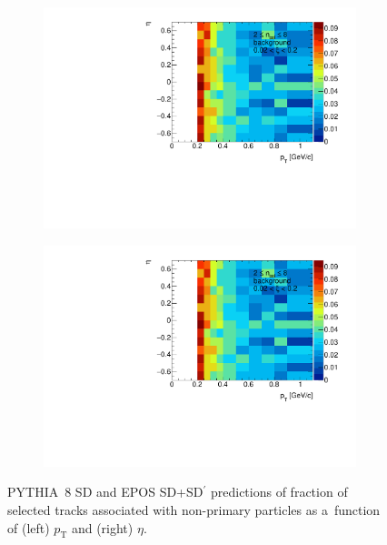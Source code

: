 \begin{figure}[h!]
	\centering
	\begin{subfigure}{.45\textwidth}
		\includegraphics[width=\linewidth, page=8]{chapters/chrgSTAR/img/chargedBkg/bkg2D.pdf}
	\end{subfigure}
	\begin{subfigure}{.45\textwidth}
		\includegraphics[width=\linewidth, page=9]{chapters/chrgSTAR/img/chargedBkg/bkg2D.pdf}
	\end{subfigure}
	\caption{PYTHIA~8 SD and EPOS SD+SD$^\prime$ predictions of fraction of selected tracks  associated with non-primary particles  as a~function of (left) $p_\textrm{T}$ and (right) $\eta$.}
	\label{fig:bkg_epos_charged_1D}
	
\end{figure}



